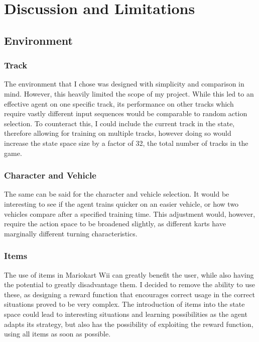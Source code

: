\chapter{Discussion and Limitations}
\section{Environment}
\subsection{Track}
The environment that I chose was designed with simplicity and comparison in mind. However, this heavily limited the scope of my project. While this led to an effective agent on one specific track, its performance on other tracks which require vastly different input sequences would be comparable to random action selection. To counteract this, I could include the current track in the state, therefore allowing for training on multiple tracks, however doing so would increase the state space size by a factor of 32, the total number of tracks in the game. 
\subsection{Character and Vehicle}
The same can be said for the character and vehicle selection. It would be interesting to see if the agent trains quicker on an easier vehicle, or how two vehicles compare after a specified training time. This adjustment would, however, require the action space to be broadened slightly, as different karts have marginally different turning characteristics. 
\subsection{Items}
The use of items in Mariokart Wii can greatly benefit the user, while also having the potential to greatly disadvantage them. I decided to remove the ability to use these, as designing a reward function that encourages correct usage in the correct situations proved to be very complex. The introduction of items into the state space could lead to interesting situations and learning possibilities as the agent adapts its strategy, but also has the possibility of exploiting the reward function, using all items as soon as possible.
